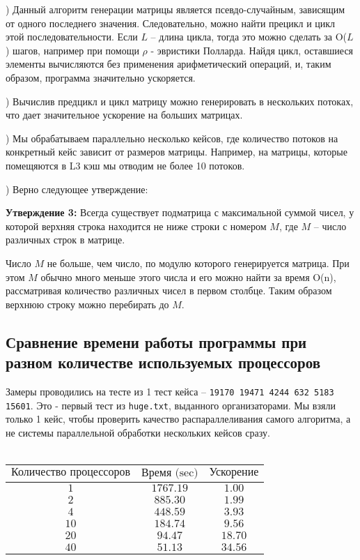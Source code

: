 \documentclass[12pt,a4paper]{article}
\begin{document}
) Данный алгоритм генерации матрицы является псевдо-случайным, зависящим от одного последнего значения. Следовательно, можно найти прецикл и цикл этой последовательности. Если $L$ -- длина цикла, тогда это можно сделать за O($L$) шагов, например при помощи $\rho$ - эвристики Полларда. Найдя цикл, оставшиеся элементы вычисляются без применения арифметический операций, и, таким образом, программа значительно ускоряется.


\bigskip
{}) Вычислив предцикл и цикл матрицу можно генерировать в нескольких потоках, что дает значительное ускорение на больших матрицах.


\bigskip
{}) Мы обрабатываем параллельно несколько кейсов, где количество потоков на конкретный кейс зависит от размеров матрицы. Например, на матрицы, которые помещяются в L3 кэш мы отводим не более 10 потоков.


\bigskip
{}) Верно следующее утверждение:

\smallskip
\textbf{Утверждение 3:} Всегда существует подматрица с максимальной суммой чисел, у которой верхняя строка находится не ниже строки с номером $M$, где $M$ -- число различных строк в матрице.

\smallskip
Число $M$ не больше, чем число, по модулю которого генерируется матрица. При этом $M$ обычно много меньше этого числа и его можно найти за время O(n), рассматривая количество различных чисел в первом столбце. Таким образом верхнюю строку можно перебирать до $M$.


\newpage
\subsection{Сравнение времени работы программы при разном количестве используемых процессоров}
Замеры проводились на тесте из 1 тест кейса -- \texttt{19170 19471 4244 632 5183 15601}. Это - первый тест из \texttt{huge.txt}, выданного организаторами. Мы взяли только 1 кейс, чтобы проверить качество распараллеливания самого алгоритма, а не системы параллельной обработки нескольких кейсов сразу. 
\\
\\
\begin{tabular}{|c|c|c|}
\hline 
$\text{Количество процессоров}$ & $\text{Время (sec)}$ & $\text{Ускорение} $ \\ 
\hline 
$1$ & $1767.19$ &  $1.00$ \\ 
\hline 
$2$ & $885.30$  &  $1.99$ \\ 
\hline 
$4$ & $448.59$  &  $3.93$ \\ 
\hline 
$10$ & $184.74$ & $9.56$ \\ 
\hline 
$20$ & $94.47$ & $18.70$ \\ 
\hline 
$40$ & $51.13$ & $34.56$ \\
\hline
\end{tabular}
\end{document}
